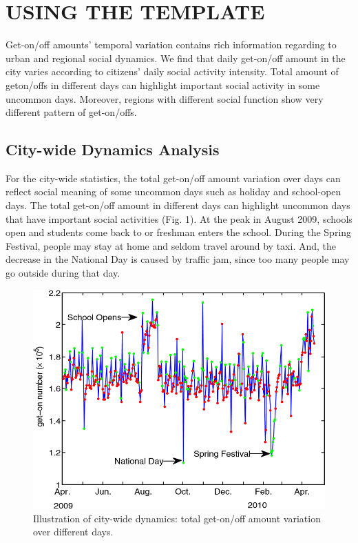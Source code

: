 \documentclass[a4paper, 10pt, conference]{ieeeconf}      %
\begin{document}
\section{USING THE TEMPLATE}%

Get-on/off amounts’ temporal variation contains rich information regarding to urban and regional social dynamics. We find that daily get-on/off amount in the city varies according to citizens’ daily social activity intensity. Total amount of geton/offs in different days can highlight important social activity in some uncommon days. Moreover, regions with different social function show very different pattern of get-on/offs.

\subsection{City-wide Dynamics Analysis} For the city-wide statistics, the total get-on/off amount variation over days can reflect social meaning of some uncommon days such as holiday and school-open days.
The total get-on/off amount in different days can highlight uncommon days that have important social activities (Fig. 1). At the peak in August 2009, schools open and students come back to or freshman enters the school. During the Spring Festival, people may stay at home and seldom travel around by taxi. And, the decrease in the National Day is caused by traffic jam, since too many people may go outside during that day.

\begin{figure}[htbp]
    \centering
    \includegraphics{fig/f1.png}
    \caption{Illustration of city-wide dynamics: total get-on/off amount variation over different days.}
    \label{fig:my_label_1}
\end{figure}
\end{document}
